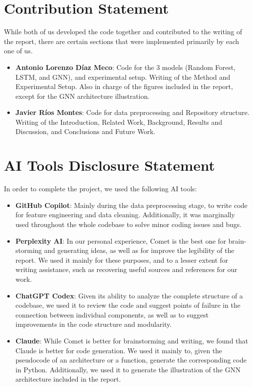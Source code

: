 \documentclass{article}
\begin{document}
\section*{Contribution Statement}

While both of us developed the code together and contributed to the writing of the report, there are certain sections that were implemented primarily by each one of us.

\begin{itemize}
    \item \textbf{Antonio Lorenzo Díaz Meco}: Code for the 3 models (Random Forest, LSTM, and GNN), and experimental setup. Writing of the Method and Experimental Setup. Also in charge of the figures included in the report, except for the GNN architecture illustration.
    \item \textbf{Javier Ríos Montes}: Code for data preprocessing and Repository structure. Writing of the Introduction, Related Work, Background, Results and Discussion, and Conclusions and Future Work.
\end{itemize}

\section*{AI Tools Disclosure Statement}

In order to complete the project, we used the following AI tools:
\begin{itemize}
    \item \textbf{GitHub Copilot}: Mainly during the data preprocessing stage, to write code for feature engineering and data cleaning. Additionally, it was marginally used throughout the whole codebase to solve minor coding issues and bugs.
    \item \textbf{Perplexity AI}: In our personal experience, Comet is the best one for brain-storming and generating ideas, as well as for improve the legibility of the report. We used it mainly for these purposes, and to a lesser extent for writing assistance, such as recovering useful sources and references for our work.
    \item \textbf{ChatGPT Codex}: Given its ability to analyze the complete structure of a codebase, we used it to review the code and suggest points of failure in the connection between individual components, as well as to suggest improvements in the code structure and modularity.
    \item \textbf{Claude}: While Comet is better for brainstorming and writing, we found that Claude is better for code generation. We used it mainly to, given the pseudocode of an architecture or a function, generate the corresponding code in Python. Additionally, we used it to generate the illustration of the GNN architecture included in the report.
\end{itemize}
\end{document}

